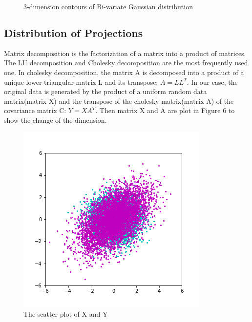 \documentclass[10pt]{article}
\begin{document}
\begin{figure}
	\quad
	\caption{3-dimension contours of Bi-variate Gaussian distribution}
	\label{3D contours of Bi-variate Gaussian Distribution}
\end{figure}

\subsection{Distribution of Projections}

Matrix decomposition is the factorization of a matrix into a product of matrices. The LU decomposition and Cholesky decomposition are the most frequently used one. In cholesky decomposition, the matrix A is decomposed into a product of a unique lower triangular matrix L and its transpose: $A=LL^{T}$. In our case, the original data is generated by the product of a uniform random data matrix(matrix X)  and the transpose of the cholesky matrix(matrix A) of the covariance matrix C: $Y=XA^{T}$. Then matrix X and A are plot in Figure 6 to show the change of the dimension.

\begin{figure}
\centering 
\vspace{-5mm}
\hspace{20mm}
\includegraphics[width=0.7\linewidth]{originalData.png} 
\caption{\footnotesize  The scatter plot of X and Y}
\centering
\end{figure}
\end{document}
